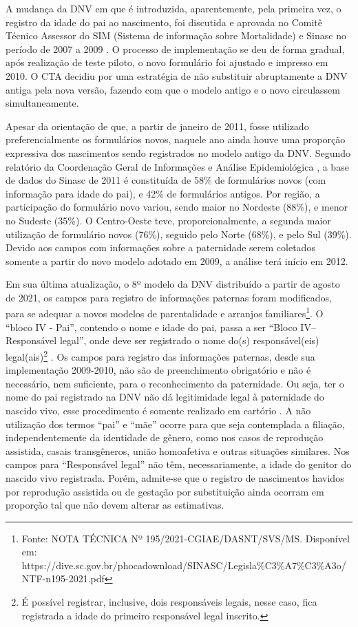 A mudança da DNV em que é introduzida, aparentemente, pela primeira vez, o registro da idade do pai ao nascimento, foi discutida e aprovada no Comitê Técnico Assessor do SIM (Sistema de informação sobre Mortalidade) e Sinasc no período de 2007 a 2009 \cite{BRConsolidacaoSINASC2011}. O processo de implementação se deu de forma gradual, após realização de teste piloto, o novo formulário foi ajustado e impresso em 2010. O CTA decidiu por uma estratégia de não substituir abruptamente a DNV antiga pela nova versão, fazendo com que o modelo antigo e o novo circulassem simultaneamente.

Apesar da orientação de que, a partir de janeiro de 2011, fosse utilizado preferencialmente os formulários novos, naquele ano ainda houve uma proporção expressiva dos nascimentos sendo registrados no modelo antigo da DNV. Segundo relatório da Coordenação Geral de Informações e Análise Epidemiológica \cite{BRConsolidacaoSINASC2011}, a base de dados do Sinasc de 2011 é constituída de 58\% de formulários novos (com informação para idade do pai), e 42\% de formulários antigos. Por região, a participação do formulário novo variou, sendo maior no Nordeste (88\%), e menor no Sudeste (35\%). O Centro-Oeste teve, proporcionalmente, a segunda maior utilização de formulário novos (76\%), seguido pelo Norte (68\%), e pelo Sul (39\%). Devido aos campos com informações sobre a paternidade serem coletados somente a partir do novo modelo adotado em 2009, a análise terá início em 2012.

Em sua última atualização, o 8º modelo da DNV distribuído a partir de agosto de 2021, os campos para registro de informações paternas foram modificados, para se adequar a novos modelos de parentalidade e arranjos familiares\footnote{Fonte: NOTA TÉCNICA Nº 195/2021-CGIAE/DASNT/SVS/MS. Disponível em: https://dive.sc.gov.br/phocadownload/SINASC/Legisla\%C3\%A7\%C3\%A3o/NTF-n195-2021.pdf}.
O “bloco IV - Pai”, contendo o nome e idade do pai, passa a ser “Bloco IV– Responsável legal”, onde deve ser registrado o nome do(s) responsável(eis) legal(ais)\footnote{É possível registrar, inclusive, dois responsáveis legais, nesse caso, fica registrada a idade do  primeiro responsável legal inscrito.} \cite{BRmanualDNV2022}. Os campos para registro das informações paternas, desde sua implementação 2009-2010, não são de preenchimento obrigatório e não é necessário, nem suficiente, para o reconhecimento da paternidade. Ou seja, ter o nome do pai registrado na DNV não dá legitimidade legal à paternidade do nascido vivo, esse procedimento é somente realizado em cartório \cite{BRmanualDNV2011}. A não utilização dos termos “pai” e “mãe” ocorre para que seja contemplada a filiação, independentemente da identidade de gênero, como nos casos de reprodução assistida, casais transgêneros, união homoafetiva e outras situações similares. Nos campos para “Responsável legal” não têm, necessariamente, a idade do genitor do nascido vivo registrada. Porém, admite-se que o registro de nascimentos havidos por reprodução assistida ou de gestação por substituição ainda ocorram em proporção tal que não devem alterar as estimativas.

